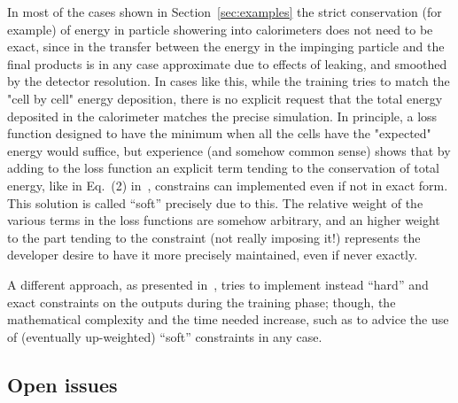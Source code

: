 In most of the cases shown in Section~\ref{sec:examples} the strict conservation (for example) of energy in particle showering into calorimeters does not need to be exact, since in the transfer  between the energy in the impinging particle and the final products is in any case approximate due to effects of leaking, and smoothed by the detector resolution. In cases like this, while the training tries to  match the "cell by cell" energy deposition, there is no explicit request that the total energy deposited in the calorimeter matches the precise simulation. In principle, a loss function designed to have the minimum when all the cells have the "expected" energy would suffice, but experience (and somehow common sense) shows that by adding to the loss function an explicit term tending to the conservation of total energy, like in Eq.~(2) in~\cite{Paganini2018}, constrains can implemented even if not in exact form. This solution is called ``soft'' precisely due to this.
The relative weight of the various terms in the loss functions are somehow arbitrary, and an higher weight to the part tending to the constraint (not really imposing it!) represents the developer desire to have it more precisely maintained, even if never exactly.

A different approach, as  presented in~\cite{Marquez-Neila2017}, tries to implement instead ``hard'' and exact constraints on the outputs during the training  phase; though, the mathematical complexity and the time needed increase, such as to advice the use of (eventually up-weighted)  ``soft'' constraints in any case.


\subsection{Open issues}

